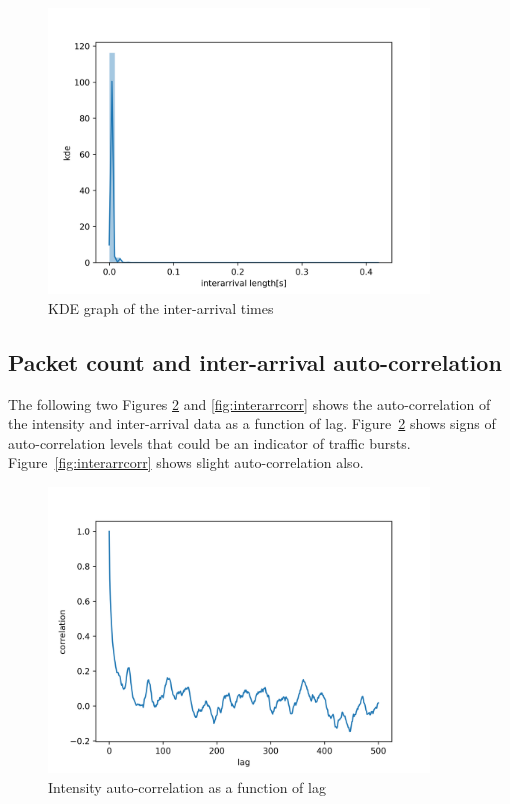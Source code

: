 \documentclass[a4paper]{article}
\begin{document}
\begin{figure}[H]
    \centering
    \includegraphics[width=0.9\textwidth]{figures/interarrival.png}
    \caption{KDE graph of the inter-arrival times}
    \label{fig:interarrival}
\end{figure}

\subsection{Packet count and inter-arrival auto-correlation}

The following two Figures \ref{fig:countcorr} and \ref{fig:interarrcorr} shows the auto-correlation of the intensity and inter-arrival data as a function of lag.
Figure~\ref{fig:countcorr} shows signs of auto-correlation levels that could be an indicator of traffic bursts. Figure~\ref{fig:interarrcorr} shows slight auto-correlation also.

\begin{figure}[H]
    \centering
    \includegraphics[width=0.9\textwidth]{figures/packet_count_correlation.png}
    \caption{Intensity auto-correlation as a function of lag}
    \label{fig:countcorr}
\end{figure}
\end{document}
